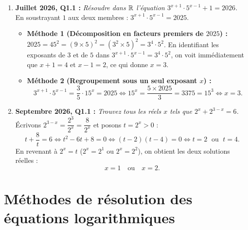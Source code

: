 \begin{exemple}
\begin{enumerate}
    \item \textbf{Juillet 2026, Q1.1 :} \emph{Résoudre dans $\mathbb{R}$ l'équation $3^{x+1}\cdot 5^{x-1} + 1 = 2026$.}\\
    En soustrayant $1$ aux deux membres : $3^{x+1}\cdot 5^{x-1} = 2025$.
    \begin{itemize}
        \item \textbf{Méthode 1 (Décomposition en facteurs premiers de $2025$) :} $2025 = 45^2 = (9 \times 5)^2 = (3^2 \times 5)^2 = 3^4 \cdot 5^2$.
        En identifiant les exposants de $3$ et de $5$ dans $3^{x+1}\cdot 5^{x-1} = 3^4 \cdot 5^2$, on voit immédiatement que $x + 1 = 4$ et $x - 1 = 2$, ce qui donne $\boxed{x = 3}$.
        \item \textbf{Méthode 2 (Regroupement sous un seul exposant $x$) :}
        \[
            3^{x+1}\cdot 5^{x-1} = \frac{3}{5}\cdot 15^x = 2025 \iff 15^x = \frac{5 \times 2025}{3} = 3375 = 15^3 \iff \boxed{x = 3}.
        \]
    \end{itemize}

    \item \textbf{Septembre 2026, Q1.1 :} \emph{Trouvez tous les réels $x$ tels que $2^x + 2^{3-x} = 6$.}\\
    Écrivons $2^{3-x} = \dfrac{2^3}{2^x} = \dfrac{8}{2^x}$ et posons $t = 2^x > 0$ :
    \[
        t + \frac{8}{t} = 6 \iff t^2 - 6t + 8 = 0 \iff (t - 2)(t - 4) = 0 \iff t = 2 \;\text{ ou }\; t = 4.
    \]
    En revenant à $2^x = t$ ($2^x = 2^1$ ou $2^x = 2^2$), on obtient les deux solutions réelles :
    \[
        \boxed{x = 1 \quad \text{ou} \quad x = 2}.
    \]
\end{enumerate}
\end{exemple}

\section{Méthodes de résolution des équations logarithmiques}

